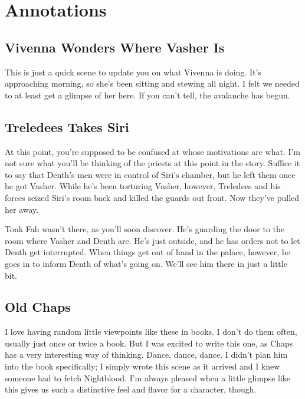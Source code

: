 \section*{Annotations}

\subsection*{Vivenna Wonders Where Vasher Is}

This is just a quick scene to update you on what Vivenna is doing. It’s approaching morning, so she’s been sitting and stewing all night. I felt we needed to at least get a glimpse of her here. If you can’t tell, the avalanche has begun.

\subsection*{Treledees Takes Siri}

At this point, you’re supposed to be confused at whose motivations are what. I’m not sure what you’ll be thinking of the priests at this point in the story. Suffice it to say that Denth’s men were in control of Siri’s chamber, but he left them once he got Vasher. While he’s been torturing Vasher, however, Treledees and his forces seized Siri’s room back and killed the guards out front. Now they’ve pulled her away.

Tonk Fah wasn’t there, as you’ll soon discover. He’s guarding the door to the room where Vasher and Denth are. He’s just outside, and he has orders not to let Denth get interrupted. When things get out of hand in the palace, however, he goes in to inform Denth of what’s going on. We’ll see him there in just a little bit.

\subsection*{Old Chaps}

I love having random little viewpoints like these in books. I don’t do them often, usually just once or twice a book. But I was excited to write this one, as Chaps has a very interesting way of thinking. Dance, dance, dance. I didn’t plan him into the book specifically; I simply wrote this scene as it arrived and I knew someone had to fetch Nightblood. I’m always pleased when a little glimpse like this gives us such a distinctive feel and flavor for a character, though.


